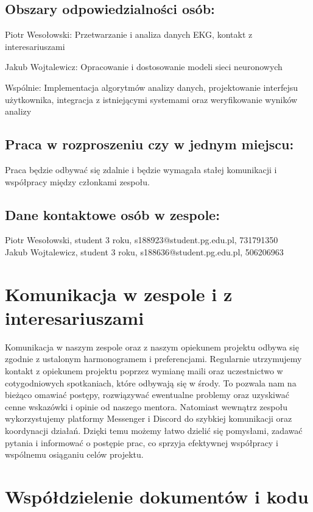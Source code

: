 \documentclass[12pt]{article}
\begin{document}
        \subsection*{Obszary odpowiedzialności osób:}
            Piotr Wesołowski: Przetwarzanie i analiza danych EKG, kontakt z interesariuszami 

            Jakub Wojtalewicz: Opracowanie i dostosowanie modeli sieci neuronowych 

            Wspólnie: Implementacja algorytmów analizy danych, projektowanie interfejsu użytkownika, integracja z istniejącymi systemami oraz weryfikowanie wyników analizy 

        \subsection*{Praca w rozproszeniu czy w jednym miejscu:}  
            Praca będzie odbywać się zdalnie i będzie wymagała stałej komunikacji i współpracy między członkami zespołu. 

        \subsection*{Dane kontaktowe osób w zespole:}
            Piotr Wesołowski, student 3 roku, s188923@student.pg.edu.pl, 731791350 \\
            Jakub Wojtalewicz, student 3 roku, s188636@student.pg.edu.pl, 506206963 

    \section{Komunikacja w zespole i z interesariuszami}

        Komunikacja w naszym zespole oraz z naszym opiekunem projektu odbywa się zgodnie z ustalonym harmonogramem i preferencjami. Regularnie utrzymujemy kontakt z opiekunem projektu poprzez wymianę maili oraz uczestnictwo w cotygodniowych spotkaniach, które odbywają się w środy. To pozwala nam na bieżąco omawiać postępy, rozwiązywać ewentualne problemy oraz uzyskiwać cenne wskazówki i opinie od naszego mentora. Natomiast wewnątrz zespołu wykorzystujemy platformy Messenger i Discord do szybkiej komunikacji oraz koordynacji działań. Dzięki temu możemy łatwo dzielić się pomysłami, zadawać pytania i informować o postępie prac, co sprzyja efektywnej współpracy i wspólnemu osiąganiu celów projektu. 

    \section{Współdzielenie dokumentów i kodu }
            
\end{document}
